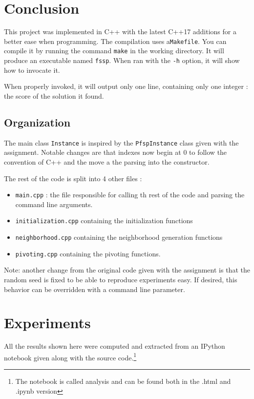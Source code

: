 \documentclass[a4paper]{article}
\begin{document}
\section{Conclusion}


This project was implemented in C++ with the latest C++17 additions for a better ease when programming.
The compilation uses a\texttt{Makefile}. You can compile it by running the command \texttt{make} in the working directory. It will produce an executable named \texttt{fssp}. When ran with the \texttt{-h} option, it will show how to invocate it.

When properly invoked, it will output only one line, containing only one integer : the score of the solution it found.

\subsection{Organization}

The main class \texttt{Instance} is inspired by the \texttt{PfspInstance} class given with the assignment.
Notable changes are that indexes now begin at 0 to follow the convention of C++ and the move a the parsing into the constructor.

The rest of the code is split into 4 other files :
\begin{itemize}
\item \texttt{main.cpp} : the file responsible for calling th rest of the code and parsing the command line arguments.
\item \texttt{initialization.cpp} containing the initialization functions
\item \texttt{neighborhood.cpp} containing the neighborhood generation functions
\item \texttt{pivoting.cpp} containing the pivoting functions.
\end{itemize}

Note: another change from the original code given with the assignment is that the random seed is fixed to be able to reproduce experiments easy. If desired, this behavior can be overridden with a command line parameter.


\section{Experiments}

All the results shown here were computed and extracted from an IPython notebook
given along with the source code.\footnote{The notebook is called analysis and can be found both in the .html and .ipynb version}
\end{document}
